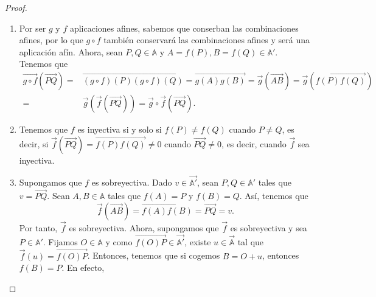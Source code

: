 \begin{proof}
	\begin{enumerate}
	\item Por ser $\displaystyle g $ y $\displaystyle f $ aplicaciones afines, sabemos que conserban las combinaciones afines, por lo que $\displaystyle g \circ f $ también conservará las combinaciones afines y será una aplicación afín. Ahora, sean $\displaystyle P,Q \in \mathbb{A} $ y $\displaystyle A = f\left(P\right), B = f\left(Q\right) \in \mathbb{A}' $. 
		Tenemos que
		\[
		\begin{split}
			\overrightarrow{g\circ f}\left(\overrightarrow{PQ}\right) = & \overrightarrow{\left(g\circ f\right)\left(P\right)\left(g\circ f\right)\left(Q\right)} = \overrightarrow{g\left(A\right)g\left(B\right)} = \vec{g}\left(\overrightarrow{AB}\right) = \vec{g} \left(\overrightarrow{f\left(P\right)f\left(Q\right)}\right) \\
			= & \vec{g}\left(\vec{f}\left(\overrightarrow{PQ}\right)\right) = \vec{g}\circ \vec{f}\left(\overrightarrow{PQ}\right)  .
		\end{split}
		\]
	\item Tenemos que $\displaystyle f $ es inyectiva si y solo si $\displaystyle f\left(P\right) \neq f\left(Q\right) $ cuando $\displaystyle P \neq Q $, es decir, si $\displaystyle \vec{f}\left(\overrightarrow{PQ}\right)=\overrightarrow{f\left(P\right)f\left(Q\right)} \neq 0 $ cuando $\displaystyle \overrightarrow{PQ} \neq 0 $, es decir, cuando $\displaystyle \vec{f} $ sea inyectiva. 
	\item Supongamos que $\displaystyle f $ es sobreyectiva. Dado $\displaystyle v \in \vec{\mathbb{A}'} $, sean $\displaystyle P,Q \in \mathbb{A}' $ tales que $\displaystyle v = \overrightarrow{PQ} $. Sean $\displaystyle A,B \in \mathbb{A} $ tales que $\displaystyle f\left(A\right) = P $ y $\displaystyle f\left(B\right) = Q $. Así, tenemos que 
		\[\vec{f}\left(\overrightarrow{AB}\right) = \overrightarrow{f\left(A\right)f\left(B\right)} = \overrightarrow{PQ} = v .\]
		Por tanto, $\displaystyle \vec{f} $ es sobreyectiva. Ahora, supongamos que $\displaystyle \vec{f} $ es sobreyectiva y sea $\displaystyle P \in \mathbb{A}' $. Fijamos $\displaystyle O \in \mathbb{A} $ y como $\displaystyle \overrightarrow{f\left(O\right)P} \in \vec{\mathbb{A}'} $, existe $\displaystyle u \in \vec{\mathbb{A}} $ tal que $\displaystyle \vec{f}\left(u\right) = \overrightarrow{f\left(O\right)P} $.
Entonces, tenemos que si cogemos $\displaystyle B = O + u $, entonces $\displaystyle f\left(B\right) = P $. En efecto,

\end{enumerate}
\end{proof}
